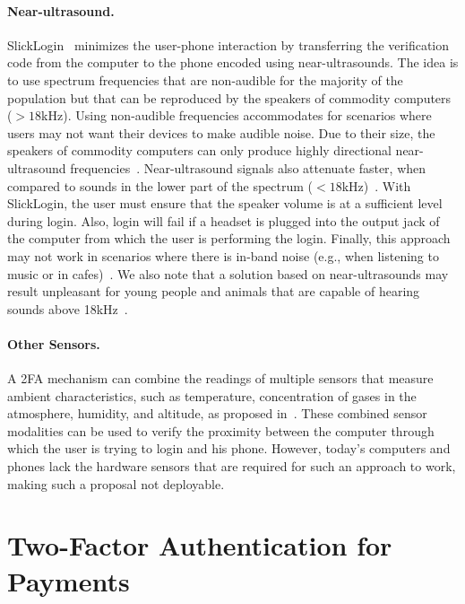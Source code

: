 \paragraph{Near-ultrasound.}
SlickLogin~\cite{slicklogin} minimizes the user-phone interaction by transferring the verification code from the computer to the phone encoded using near-ultrasounds.
The idea is to use spectrum frequencies that are non-audible for the majority of the population but that can be reproduced by the speakers of commodity computers ($>18$kHz).
Using non-audible frequencies accommodates for scenarios where users may not want their devices to make audible noise.
Due to their size, the speakers of commodity computers can only produce highly directional near-ultrasound frequencies~\cite{russell98amjphys}.
Near-ultrasound signals also attenuate faster, when compared to sounds in the lower part of the spectrum ($<18$kHz)~\cite{arentz11ubicomp,hazas02ubicomp}.
With SlickLogin, the user must ensure that the speaker volume is at a sufficient level during login.
Also, login will fail if a headset is plugged into the output jack of the computer from which the user is performing the login.
Finally, this approach may not work in scenarios where there is in-band noise (e.g., when listening to music or in cafes)~\cite{hazas02ubicomp}.
We also note that a solution based on near-ultrasounds may result unpleasant for young people and animals that are capable of hearing sounds above 18kHz~\cite{valiente14audiology}.

\paragraph{Other Sensors.}
A 2FA mechanism can combine the readings of multiple sensors that measure ambient characteristics, such as temperature, concentration of gases in the atmosphere, humidity, and altitude, as proposed in~\cite{shrestha14}. These combined sensor modalities can be used to verify the proximity between the computer through which the user is trying to login and his phone. However, today's computers and phones lack the hardware sensors that are required for such an approach to work, making such a proposal not deployable.


\section{Two-Factor Authentication for Payments}

